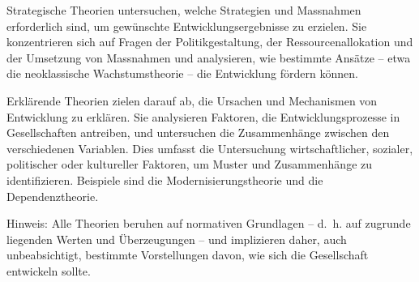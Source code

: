 \documentclass[
  nswissgerman,
  a4paper,
  openany]{book}
\begin{document}
Strategische Theorien untersuchen, welche Strategien und Massnahmen
erforderlich sind, um gewünschte Entwicklungsergebnisse zu erzielen. Sie
konzentrieren sich auf Fragen der Politikgestaltung, der
Ressourcenallokation und der Umsetzung von Massnahmen und analysieren,
wie bestimmte Ansätze -- etwa die neoklassische Wachstumstheorie -- die
Entwicklung fördern können.

Erklärende Theorien zielen darauf ab, die Ursachen und Mechanismen von
Entwicklung zu erklären. Sie analysieren Faktoren, die
Entwicklungsprozesse in Gesellschaften antreiben, und untersuchen die
Zusammenhänge zwischen den verschiedenen Variablen. Dies umfasst die
Untersuchung wirtschaftlicher, sozialer, politischer oder kultureller
Faktoren, um Muster und Zusammenhänge zu identifizieren. Beispiele sind
die Modernisierungstheorie und die Dependenztheorie.

Hinweis: Alle Theorien beruhen auf normativen Grundlagen -- d.~h. auf
zugrunde liegenden Werten und Überzeugungen -- und implizieren daher,
auch unbeabsichtigt, bestimmte Vorstellungen davon, wie sich die
Gesellschaft entwickeln sollte.

\begingroup\fontsize{8}{10}\selectfont
\end{document}
